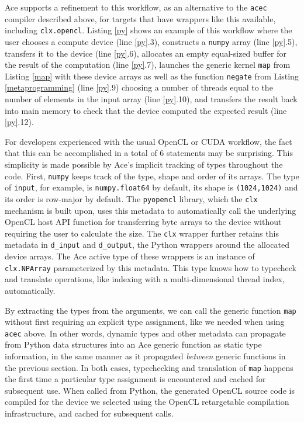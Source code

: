 \documentclass[9pt,preprint]{sigplanconf}
\begin{document}
Ace supports a refinement to this workflow, as an alternative to the \verb|acec| compiler described above, for targets that have wrappers like this available, including \verb|clx.opencl|. Listing \ref{py} shows an example of this workflow where the user chooses a compute device (line \ref{py}.3),  constructs a \verb|numpy| array (line \ref{py}.5), transfers it to the device (line \ref{py}.6), allocates an empty equal-sized buffer for the result of the computation (line \ref{py}.7), launches the {generic} kernel \verb|map| from Listing \ref{map} with these device arrays as well as the function \verb|negate| from Listing \ref{metaprogramming} (line \ref{py}.9) choosing a number of threads equal to the number of elements in the input array (line \ref{py}.10), and transfers the result back into main memory to check that the device computed the expected result (line \ref{py}.12).

For developers experienced with the usual OpenCL or CUDA workflow, the fact that this can be accomplished in a total of 6 statements may be surprising. This simplicity is made possible by Ace's implicit tracking of types throughout the code. First, \verb|numpy| keeps track of the type, shape and order of its arrays. The type of \verb|input|, for example, is \verb|numpy.float64| by default, its shape is \verb|(1024,1024)| and its order is row-major by default. The \verb|pyopencl| library, which the \verb|clx| mechanism is built upon, uses this metadata to automatically call the underlying OpenCL host API function for transferring byte arrays to the device without requiring the user to calculate the size. The \verb|clx| wrapper further retains this metadata in \verb|d_input| and \verb|d_output|, the Python wrappers around the allocated device arrays. The Ace active type of these wrappers is an instance of \verb|clx.NPArray| parameterized by this metadata. This type knows how to typecheck and translate operations, like indexing with a multi-dimensional thread index, automatically.

By extracting the types from the arguments, we can call the generic function \verb|map| without first requiring an explicit type assignment, like we needed when using \verb|acec| above. In other words, dynamic types and other metadata can propagate from Python data structures into an Ace generic function as static type information, in the same manner as it propagated \emph{between} generic functions in the previous section. In both cases, typechecking and translation of \verb|map| happens the first time a particular type assignment is encountered and cached for subsequent use. When called from Python, the generated OpenCL source code is compiled for the device we selected using the OpenCL retargetable compilation infrastructure, and cached for subsequent calls. 
\end{document}
